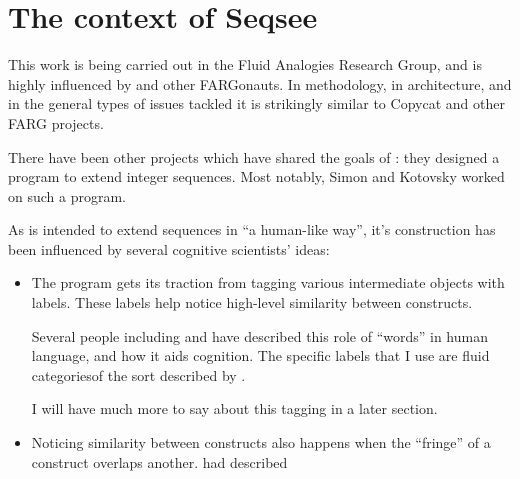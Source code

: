 \documentclass{article}
\begin{document}
\section{The context of Seqsee}
\label{sec:context}

This work is being carried out in the Fluid Analogies Research Group, and is highly influenced by \hof and other FARGonauts. In methodology, in architecture, and in the general types of issues tackled it is strikingly similar to Copycat and other FARG projects.

There have been other projects which have shared the  goals of \seq: they designed a program to extend integer sequences. Most notably, Simon and Kotovsky worked on such a program. 

As \seq is intended to extend sequences in ``a human-like way'', it's construction has been influenced by several cognitive scientists' ideas:

\begin{itemize}
\item The program gets its traction from tagging various intermediate objects with labels. These labels help \seq notice high-level similarity between constructs.

Several people including \dan and \andy have described this role of ``words'' in human language, and how it aids cognition. The specific labels that I use are fluid categoriesof the sort described by \hof.

I will have much more to say about this tagging in a later section.

\item Noticing similarity between constructs also happens when the ``fringe'' of a construct overlaps another. \cite{James} had described 
\end{itemize}



\printindex
\end{document}
